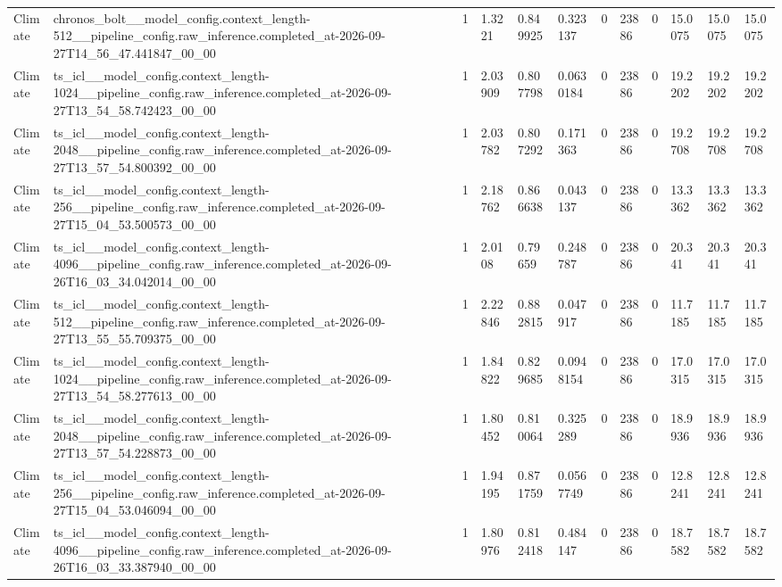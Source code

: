 \begin{tabular}{llllllllllll}
Climate & chronos\_bolt\_\_model\_config.context\_length-512\_\_pipeline\_config.raw\_inference.completed\_at-2026-09-27T14\_56\_47.441847\_00\_00 & 1 & 1.3221 & 0.849925 & 0.323137 & 0 & 23886 & 0 & 15.0075 & 15.0075 & 15.0075 \\
Climate & ts\_icl\_\_model\_config.context\_length-1024\_\_pipeline\_config.raw\_inference.completed\_at-2026-09-27T13\_54\_58.742423\_00\_00 & 1 & 2.03909 & 0.807798 & 0.0630184 & 0 & 23886 & 0 & 19.2202 & 19.2202 & 19.2202 \\
Climate & ts\_icl\_\_model\_config.context\_length-2048\_\_pipeline\_config.raw\_inference.completed\_at-2026-09-27T13\_57\_54.800392\_00\_00 & 1 & 2.03782 & 0.807292 & 0.171363 & 0 & 23886 & 0 & 19.2708 & 19.2708 & 19.2708 \\
Climate & ts\_icl\_\_model\_config.context\_length-256\_\_pipeline\_config.raw\_inference.completed\_at-2026-09-27T15\_04\_53.500573\_00\_00 & 1 & 2.18762 & 0.866638 & 0.043137 & 0 & 23886 & 0 & 13.3362 & 13.3362 & 13.3362 \\
Climate & ts\_icl\_\_model\_config.context\_length-4096\_\_pipeline\_config.raw\_inference.completed\_at-2026-09-26T16\_03\_34.042014\_00\_00 & 1 & 2.0108 & 0.79659 & 0.248787 & 0 & 23886 & 0 & 20.341 & 20.341 & 20.341 \\
Climate & ts\_icl\_\_model\_config.context\_length-512\_\_pipeline\_config.raw\_inference.completed\_at-2026-09-27T13\_55\_55.709375\_00\_00 & 1 & 2.22846 & 0.882815 & 0.047917 & 0 & 23886 & 0 & 11.7185 & 11.7185 & 11.7185 \\
Climate & ts\_icl\_\_model\_config.context\_length-1024\_\_pipeline\_config.raw\_inference.completed\_at-2026-09-27T13\_54\_58.277613\_00\_00 & 1 & 1.84822 & 0.829685 & 0.0948154 & 0 & 23886 & 0 & 17.0315 & 17.0315 & 17.0315 \\
Climate & ts\_icl\_\_model\_config.context\_length-2048\_\_pipeline\_config.raw\_inference.completed\_at-2026-09-27T13\_57\_54.228873\_00\_00 & 1 & 1.80452 & 0.810064 & 0.325289 & 0 & 23886 & 0 & 18.9936 & 18.9936 & 18.9936 \\
Climate & ts\_icl\_\_model\_config.context\_length-256\_\_pipeline\_config.raw\_inference.completed\_at-2026-09-27T15\_04\_53.046094\_00\_00 & 1 & 1.94195 & 0.871759 & 0.0567749 & 0 & 23886 & 0 & 12.8241 & 12.8241 & 12.8241 \\
Climate & ts\_icl\_\_model\_config.context\_length-4096\_\_pipeline\_config.raw\_inference.completed\_at-2026-09-26T16\_03\_33.387940\_00\_00 & 1 & 1.80976 & 0.812418 & 0.484147 & 0 & 23886 & 0 & 18.7582 & 18.7582 & 18.7582 \\

\end{tabular}
